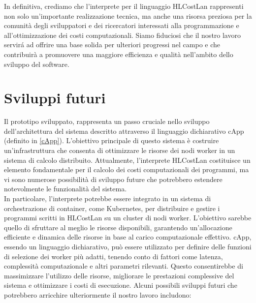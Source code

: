 \documentclass[../../main.tex]{subfiles}
\begin{document}
In definitiva, crediamo che l'interprete per il linguaggio HLCostLan rappresenti non solo un'importante realizzazione tecnica, ma anche una risorsa preziosa per la comunità degli sviluppatori e dei ricercatori interessati alla programmazione e all'ottimizzazione dei costi computazionali. Siamo fiduciosi che il nostro lavoro servirá ad offrire una base solida per ulteriori progressi nel campo e che contribuirà a promuovere una maggiore efficienza e qualità nell'ambito dello sviluppo del software.

\section{Sviluppi futuri}
Il prototipo sviluppato, rappresenta un passo cruciale nello sviluppo dell'architettura del sistema descritto attraverso il linguaggio dichiarativo cApp (definito in \ref{cApp}). L'obiettivo principale di questo sistema è costruire un'infrastruttura che consenta di ottimizzare le risorse dei nodi worker in un sistema di calcolo distribuito. Attualmente, l'interprete HLCostLan costituisce un elemento fondamentale per il calcolo dei costi computazionali dei programmi, ma vi sono numerose possibilità di sviluppo future che potrebbero estendere notevolmente le funzionalità del sistema.\\
In particolare, l'interprete potrebbe essere integrato in un sistema di orchestrazione di container, come Kubernetes, per distribuire e gestire i programmi scritti in HLCostLan su un cluster di nodi worker. L'obiettivo sarebbe quello di sfruttare al meglio le risorse disponibili, garantendo un'allocazione efficiente e dinamica delle risorse in base al carico computazionale effettivo. cApp, essendo un linguaggio dichiarativo, può essere utilizzato per definire delle funzioni di selezione dei worker più adatti, tenendo conto di fattori come latenza, complessità computazionale e altri parametri rilevanti. Questo consentirebbe di massimizzare l'utilizzo delle risorse, migliorare le prestazioni complessive del sistema e ottimizzare i costi di esecuzione.
Alcuni possibili sviluppi futuri che potrebbero arricchire ulteriormente il nostro lavoro includono:
\end{document}
